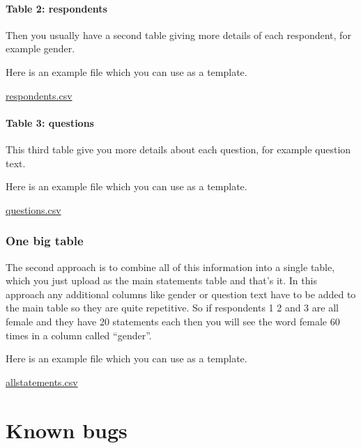 \documentclass[
]{book}
\begin{document}
\hypertarget{table-2-respondents}{%
\paragraph{Table 2: respondents}\label{table-2-respondents}}

Then you usually have a second table giving more details of each respondent, for example gender.

Here is an example file which you can use as a template.

\href{https://drive.google.com/file/d/18RNhRhbgyTGCdX_0t6N_n9qXPjxB5L8n/view?usp=drive_web}{respondents.csv}

\hypertarget{table-3-questions}{%
\paragraph{Table 3: questions}\label{table-3-questions}}

This third table give you more details about each question, for example question text.

Here is an example file which you can use as a template.

\href{hhttps://drive.google.com/file/d/18Rvsib_Lhl0Dfz6OvIkUlBn6V4CJbkxA/view?usp=drive_web}{questions.csv}

\hypertarget{one-big-table}{%
\subsubsection{One big table}\label{one-big-table}}

The second approach is to combine all of this information into a single table, which you just upload as the main statements table and that's it. In this approach any additional columns like gender or question text have to be added to the main table so they are quite repetitive. So if respondents 1 2 and 3 are all female and they have 20 statements each then you will see the word female 60 times in a column called ``gender''.

Here is an example file which you can use as a template.

\href{https://drive.google.com/file/d/18QTzZysgHCgQYY7qizPGUoKur2dLksmf/view?usp=drive_web}{allstatements.csv}

\hypertarget{known-bugs}{%
\section{Known bugs}\label{known-bugs}}
\end{document}
